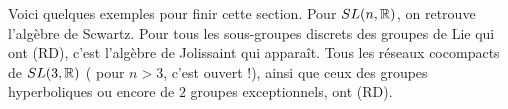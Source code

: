 Voici quelques exemples pour finir cette section. Pour $SL(n,\mathbb R)$, on retrouve l'algèbre de Scwartz. Pour tous les sous-groupes discrets des groupes de Lie qui ont (RD), c'est l'algèbre de Jolissaint qui apparaît. Tous les réseaux cocompacts de $SL(3,\mathbb R)$ ( pour $n> 3$, c'est ouvert !), ainsi que ceux des groupes hyperboliques ou encore de $2$ groupes exceptionnels, ont (RD).  

























